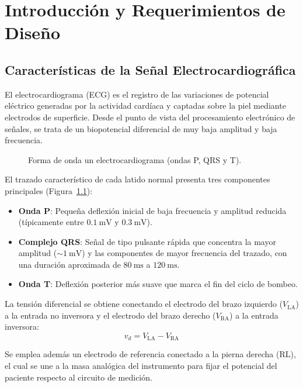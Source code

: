 \chapter{Introducción y Requerimientos de Diseño}
\label{sec:introduccion}

\section{Características de la Señal Electrocardiográfica}

El electrocardiograma (ECG) es el registro de las variaciones de potencial eléctrico generadas por la actividad cardíaca y captadas sobre la piel mediante electrodos de superficie. Desde el punto de vista del procesamiento electrónico de señales, se trata de un biopotencial diferencial de muy baja amplitud y baja frecuencia.

\begin{figure}[!ht]
  \centering
  \caption{Forma de onda un electrocardiograma (ondas P, QRS y T).}
  \label{fig:morfologia_ecg}
\end{figure}

El trazado característico de cada latido normal presenta tres componentes principales (Figura~\ref{fig:morfologia_ecg}):
\begin{itemize}
  \item \textbf{Onda P}: Pequeña deflexión inicial de baja frecuencia y amplitud reducida (típicamente entre $\SI{0.1}{\milli\volt}$ y $\SI{0.3}{\milli\volt}$).
  \item \textbf{Complejo QRS}: Señal de tipo pulsante rápida que concentra la mayor amplitud ($\sim \SI{1}{\milli\volt}$) y las componentes de mayor frecuencia del trazado, con una duración aproximada de $\SI{80}{\milli\second}$ a $\SI{120}{\milli\second}$.
  \item \textbf{Onda T}: Deflexión posterior más suave que marca el fin del ciclo de bombeo.
\end{itemize}

La tensión diferencial se obtiene conectando el electrodo del brazo izquierdo ($V_{\text{LA}}$) a la entrada no inversora y el electrodo del brazo derecho ($V_{\text{RA}}$) a la entrada inversora:
\begin{equation*}
  v_d = V_{\text{LA}} - V_{\text{RA}}
\end{equation*}

Se emplea además un electrodo de referencia conectado a la pierna derecha (RL), el cual se une a la masa analógica del instrumento para fijar el potencial del paciente respecto al circuito de medición.

